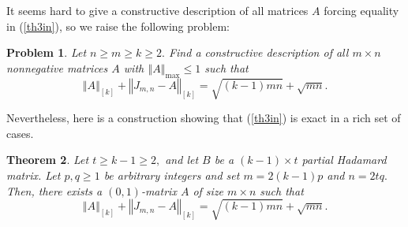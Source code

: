 \documentclass[12pt]{article}%
\newtheorem{theorem}{Theorem}[section]
\newtheorem{problem}[theorem]{Problem}
\begin{document}
It seems hard to give a constructive description of all matrices $A$ forcing
equality in (\ref{th3in}), so we raise the following problem:

\begin{problem}
Let $n\geq m\geq k\geq2.$ Find a constructive description of all $m\times n$
nonnegative matrices $A$ with $\left\Vert A\right\Vert _{\max}\leq1$ such
that
\[
\left\Vert A\right\Vert _{\left[  k\right]  }+\left\Vert J_{m,n}-A\right\Vert
_{\left[  k\right]  }=\sqrt{\left(  k-1\right)  mn}+\sqrt{mn}.
\]

\end{problem}

Nevertheless, here is a construction showing that (\ref{th3in}) is exact in a
rich set of cases.

\begin{theorem}
\label{th3a}Let $t\geq k-1\geq2,$ and let $B$ be a $\left(  k-1\right)  \times
t$ partial Hadamard matrix. Let $p,q\geq1$ be arbitrary integers and set
$m=2\left(  k-1\right)  p$ and $n=2tq.$ Then, there exists a $\left(
0,1\right)  $-matrix $A$ of size $m\times n$ such that
\[
\left\Vert A\right\Vert _{\left[  k\right]  }+\left\Vert J_{m,n}-A\right\Vert
_{\left[  k\right]  }=\sqrt{\left(  k-1\right)  mn}+\sqrt{mn}.
\]

\end{theorem}
\end{document}
